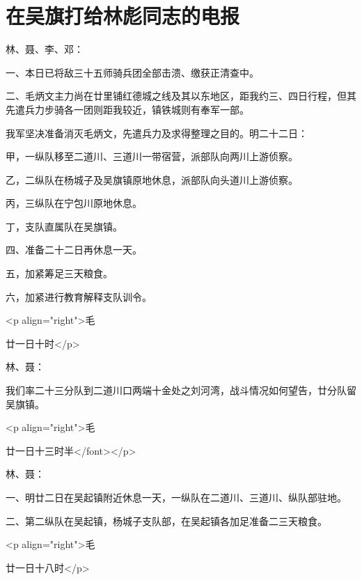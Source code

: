 \section[在吴旗打给林彪同志的电报（一九三五年十一月二十一日）]{在吴旗打给林彪同志的电报}


林、聂、李、邓：

一、本日已将敌三十五师骑兵团全部击溃、缴获正清查中。

二、毛炳文主力尚在廿里铺红德城之线及其以东地区，距我约三、四日行程，但其先遣兵力步骑各一团则距我较近，镇铁城则有奉军一部。


我军坚决准备消灭毛炳文，先遣兵力及求得整理之目的。明二十二日：

甲，一纵队移至二道川、三道川一带宿营，派部队向两川上游侦察。

乙，二纵队在杨城子及吴旗镇原地休息，派部队向头道川上游侦察。

丙，三纵队在宁包川原地休息。

丁，支队直属队在吴旗镇。

四、准备二十二日再休息一天。

五，加紧筹足三天粮食。

六，加紧进行教育解释支队训令。

<p align="right">毛

 廿一日十时</p>


林、聂：

我们率二十三分队到二道川口两端十金处之刘河湾，战斗情况如何望告，廿分队留吴旗镇。

<p align="right">毛

廿一日十三时半</font></p>


林、聂：

一、明廿二日在吴起镇附近休息一天，一纵队在二道川、三道川、纵队部驻地。

二、第二纵队在吴起镇，杨城子支队部，在吴起镇各加足准备二三天粮食。

<p align="right">毛

 廿一日十八时</p>

